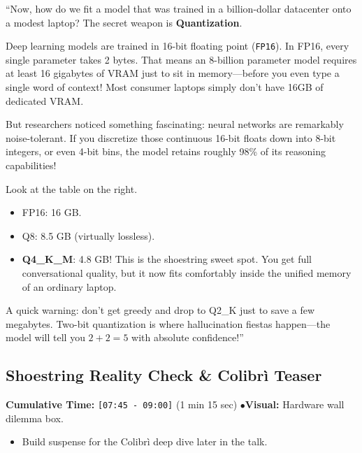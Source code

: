 \documentclass[11pt,a4paper]{article}
\begin{document}
\begin{speechbox}
``Now, how do we fit a model that was trained in a billion-dollar datacenter onto a modest laptop? The secret weapon is \textbf{Quantization}.

Deep learning models are trained in 16-bit floating point (\texttt{FP16}). In FP16, every single parameter takes 2 bytes. That means an 8-billion parameter model requires at least 16 gigabytes of VRAM just to sit in memory---before you even type a single word of context! Most consumer laptops simply don't have 16GB of dedicated VRAM.

But researchers noticed something fascinating: neural networks are remarkably noise-tolerant. If you discretize those continuous 16-bit floats down into 8-bit integers, or even 4-bit bins, the model retains roughly 98\% of its reasoning capabilities!

Look at the table on the right. 
\begin{itemize}
    \item FP16: 16 GB.
    \item Q8: 8.5 GB (virtually lossless).
    \item \textbf{Q4\_K\_M}: 4.8 GB! This is the shoestring sweet spot. You get full conversational quality, but it now fits comfortably inside the unified memory of an ordinary laptop.
\end{itemize}

A quick warning: don't get greedy and drop to Q2\_K just to save a few megabytes. Two-bit quantization is where hallucination fiestas happen---the model will tell you $2 + 2 = 5$ with absolute confidence!''
\end{speechbox}

\subsection{Shoestring Reality Check \& Colibr\`i Teaser}
\begin{directionbox}
    \textbf{Cumulative Time:} \texttt{[07:45 - 09:00]} (1 min 15 sec) \quad$\bullet$\quad \textbf{Visual:} Hardware wall dilemma box.
    \begin{itemize}
        \item Build suspense for the Colibr\`i deep dive later in the talk.
    \end{itemize}
\end{directionbox}
\end{document}
